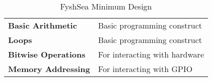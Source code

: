 \newcommand{\fy}[2]{%
	\textbf{#1} & #2 \\%
	\hline%
}
\begin{table}[H]
	\begin{tabularx}{\textwidth}{| a | x |}
		\hline
		 &  \\
		\hline
		\fy{Basic Arithmetic}{Basic programming construct}
		\fy{Loops}{Basic programming construct}
		\fy{Bitwise Operations}{For interacting with hardware}
		\fy{Memory Addressing}{For interacting with GPIO}
	\end{tabularx}
	\label{Tab:fysh}
	\caption{FyshSea Minimum Design}
\end{table}

